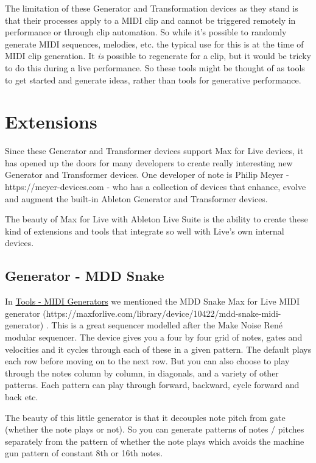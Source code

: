 \documentclass[
  12pt,
  letterpaper,
  oneside,
  open=any]{scrbook}
\begin{document}
The limitation of these Generator and Transformation devices as they
stand is that their processes apply to a MIDI clip and cannot be
triggered remotely in performance or through clip automation. So while
it's possible to randomly generate MIDI sequences, melodies, etc. the
typical use for this is at the time of MIDI clip generation. It
\emph{is} possible to regenerate for a clip, but it would be tricky to
do this during a live performance. So these tools might be thought of as
tools to get started and generate ideas, rather than tools for
generative performance.

\section{Extensions}\label{extensions}

Since these Generator and Transformer devices support Max for Live
devices, it has opened up the doors for many developers to create really
interesting new Generator and Transformer devices. One developer of note
is Philip Meyer - https://meyer-devices.com - who has a collection of
devices that enhance, evolve and augment the built-in Ableton Generator
and Transformer devices.

The beauty of Max for Live with Ableton Live Suite is the ability to
create these kind of extensions and tools that integrate so well with
Live's own internal devices.

\subsection{Generator - MDD Snake}\label{generator---mdd-snake}

In \hyperref[012-Tools-MIDI_Generators]{Tools - MIDI Generators} we
mentioned the MDD Snake Max for Live MIDI generator
(https://maxforlive.com/library/device/10422/mdd-snake-midi-generator) .
This is a great sequencer modelled after the Make Noise René modular
sequencer. The device gives you a four by four grid of notes, gates and
velocities and it cycles through each of these in a given pattern. The
default plays each row before moving on to the next row. But you can
also choose to play through the notes column by column, in diagonals,
and a variety of other patterns. Each pattern can play through forward,
backward, cycle forward and back etc.

The beauty of this little generator is that it decouples note pitch from
gate (whether the note plays or not). So you can generate patterns of
notes / pitches separately from the pattern of whether the note plays
which avoids the machine gun pattern of constant 8th or 16th notes.
\end{document}
